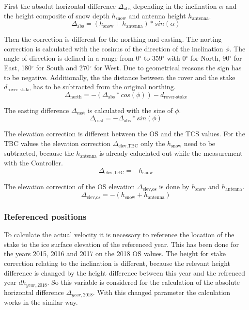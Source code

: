 First the absolut horizontal difference $\Delta_{\text{abs}}$ depending in the inclination $\alpha$ and the height composite of snow depth $h_{\text{snow}}$ and antenna height $h_{\text{antenna}}$.
\begin{equation}
	\Delta_{\text{abs}} = (h_{\text{snow}} + h_{\text{antenna}}) * sin(\alpha)
\end{equation}

Then the correction is different for the northing and easting. The norting correction is calculated with the cosinus of the direction of the inclination $\phi$. 
The angle of direction is defined in a range from 0$^{\circ}$ to 359$^{\circ}$ with 0$^{\circ}$ for North, 90$^{\circ}$ for East, 180$^{\circ}$ for South and 270$^{\circ}$ for West.
Due to geometrical reasons the sign has to be negative. 
Additionally, the the distance between the rover and the stake $d_{\text{rover-stake}}$ has to be subtracted from the original northing.
\begin{equation}
	\Delta_{\text{north}} = - (\Delta_{\text{abs}} * cos(\phi)) - d_{\text{rover-stake}}
\end{equation}

The easting difference $\Delta_{\text{east}}$ is calculated with the sine of $\phi$.
\begin{equation}
	\Delta_{\text{east}} = - \Delta_{\text{abs}} * sin(\phi)
\end{equation}

The elevation correction is different between the OS and the TCS values.
For the TBC values the elevation correction $\Delta_{\text{elev,TBC}}$ only the $h_{\text{snow}}$ need to be subtracted, because the $h_{\text{antenna}}$ is already caluclated out while the measurement with the Controller.
\begin{equation}
	\Delta_{\text{elev,TBC}} = - h_{\text{snow}} 
\end{equation}

The elevation correction of the OS elevation $\Delta_{\text{elev,os}}$ is done by $h_{\text{snow}}$ and $h_{\text{antenna}}$.
\begin{equation}
	\Delta_{\text{elev,os}} = - (h_{\text{snow}} + h_{\text{antenna}}) 
\end{equation}

\subsubsection*{Referenced positions}

To calculate the actual velocity it is necessary to reference the location of the stake to the ice surface elevation of the referenced year. 
This has been done for the years 2015, 2016 and 2017 on the 2018 OS values.
The height for stake correction relating to the inclination is different, because the relevant height difference is changed by the height difference between this year and the refrenced year $dh_{year,2018}$. So this variable is considered for the calculation of the absolute horizontal difference $\Delta_{year,2018}$. With this changed parameter the calculation works in the similar way.

